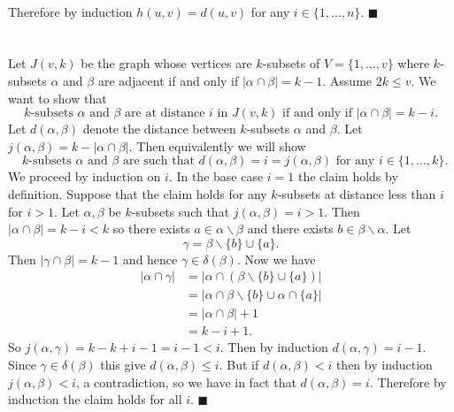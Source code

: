 \documentclass[letterpaper,12pt,oneside,onecolumn]{article}
\newcommand{\1}{\mathbbm{1}}
\begin{document}
\paragraph{}
Therefore by induction $h(u,v) = d(u,v)$ for any $i \in \{1,\dots, n\}$. $\blacksquare$

\section{}
Let $J(v,k)$ be the graph whose vertices are $k$-subsets of $V = \{1,\dots,v\}$ where $k$-subsets $\alpha$ and $\beta$ are adjacent if and only if $|\alpha \cap \beta | = k-1$. Assume $2k \leq v$. We want to show that $$\text{$k$-subsets $\alpha$ and $\beta$ are at distance $i$ in $J(v,k)$ if and only if $|\alpha \cap \beta | = k-i$}.$$
Let $d(\alpha,\beta)$ denote the distance between $k$-subsets $\alpha$ and $\beta$. Let $j(\alpha, \beta) = k - |\alpha \cap \beta|$. Then equivalently we will show
$$\text{ $k$-subsets $\alpha$ and $\beta$ are such that $d(\alpha, \beta) = i = j(\alpha, \beta)$ for any $i \in \{1, \dots, k\}$}.$$
We proceed by induction on $i$. In the base case $i=1$ the claim holds by definition. Suppose that the claim holds for any $k$-subsets at distance less than $i$ for $i>1$. Let $\alpha, \beta$ be $k$-subsets such that $j(\alpha, \beta) = i > 1$.  Then 
$|\alpha \cap \beta| = k -i < k$
so there exists $a \in \alpha\backslash\beta$ and there exists $b \in \beta\backslash\alpha$.  Let $$\gamma = \beta \backslash \{b\} \cup \{a\}.$$
Then $|\gamma \cap \beta | = k-1$ and hence $\gamma \in \delta(\beta)$. Now we have
\begin{align*}
|\alpha \cap \gamma | &= | \alpha \cap (\beta \backslash \{b\} \cup \{a\})| \\
&= | \alpha \cap \beta \backslash\{b\} \cup \alpha \cap \{a\}| \\
&=|\alpha \cap \beta | + 1 \\
&= k - i + 1.
\end{align*}
So $j(\alpha, \gamma) = k - k + i -1 = i -1 < i$. Then by induction $d(\alpha, \gamma) = i-1$. Since $\gamma \in \delta(\beta)$ this give $d(\alpha, \beta) \leq i$. But if $d(\alpha,\beta) < i$ then by induction $j(\alpha, \beta) < i$, a contradiction, so we have in fact that $d(\alpha, \beta) = i$. Therefore by induction the claim holds for all $i$. $\blacksquare$
\end{document}
